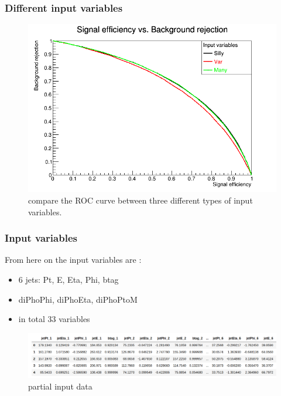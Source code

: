 \documentclass{beamer}
\begin{document}
\begin{frame}
\frametitle{Different input variables}
\begin{figure}
\includegraphics[scale=0.25]{./figures/ROC_Curve3.png}
\caption{compare the ROC curve between three different types of input variables.}
\end{figure}
\end{frame}

\begin{frame}
\frametitle{Input variables}
From here on the input variables are :
\begin{itemize}
\item 6 jets: Pt,  E,  Eta, Phi, btag
\item diPhoPhi, diPhoEta, diPhoPtoM
\item in total 33 variables
\end{itemize}
\begin{figure}
\includegraphics[scale=0.25]{./figures/input.png}
\caption{partial input data}
\end{figure}
\end{frame}
\end{document}
